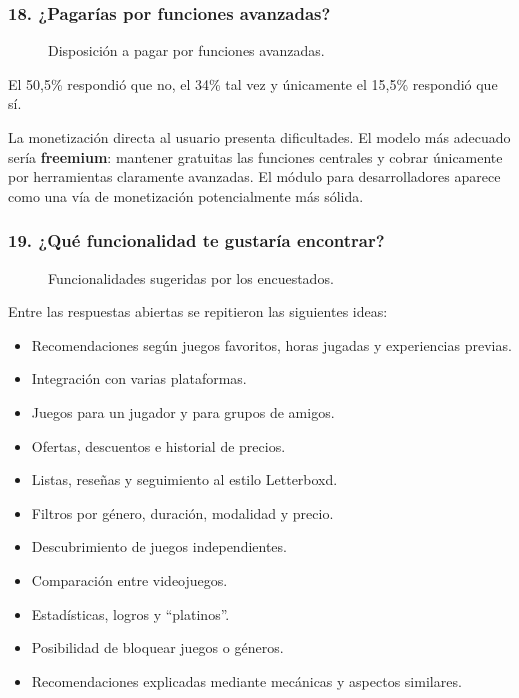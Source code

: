 \subsubsection*{18. ¿Pagarías por funciones avanzadas?}

\begin{figure}[H]
	\centering
	\caption{Disposición a pagar por funciones avanzadas.}
	\label{fig:enc-p18}
\end{figure}

El 50,5\% respondió que no, el 34\% tal vez y únicamente el 15,5\% respondió que sí.

La monetización directa al usuario presenta dificultades. El modelo más adecuado sería \textbf{freemium}: mantener gratuitas las funciones centrales y cobrar únicamente por herramientas claramente avanzadas. El módulo para desarrolladores aparece como una vía de monetización potencialmente más sólida.

\subsubsection*{19. ¿Qué funcionalidad te gustaría encontrar?}

\begin{figure}[H]
	\centering
	\caption{Funcionalidades sugeridas por los encuestados.}
	\label{fig:enc-p19}
\end{figure}

Entre las respuestas abiertas se repitieron las siguientes ideas:

\begin{itemize}
	\item Recomendaciones según juegos favoritos, horas jugadas y experiencias previas.
	\item Integración con varias plataformas.
	\item Juegos para un jugador y para grupos de amigos.
	\item Ofertas, descuentos e historial de precios.
	\item Listas, reseñas y seguimiento al estilo Letterboxd.
	\item Filtros por género, duración, modalidad y precio.
	\item Descubrimiento de juegos independientes.
	\item Comparación entre videojuegos.
	\item Estadísticas, logros y \enquote{platinos}.
	\item Posibilidad de bloquear juegos o géneros.
	\item Recomendaciones explicadas mediante mecánicas y aspectos similares.
\end{itemize}

